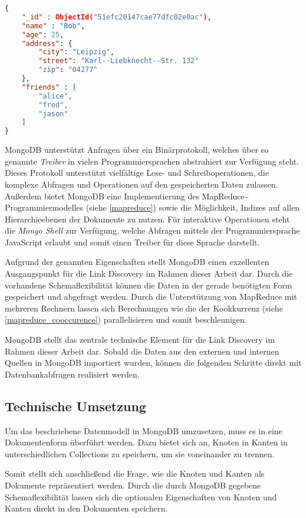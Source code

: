 \begin{lstlisting}[language=json, label={lst:json}, caption={Ein Beispiel für ein Dokument in MongoDB}]
{
    "_id" : ObjectId("51efc20147cae77dfc02e0ac"),
    "name" : "Bob",
    "age": 25,
    "address": {
        "city": "Leipzig",
        "street": "Karl--Liebknecht--Str. 132"
        "zip": "04277"
    },
    "friends" : [
        "alice",
        "fred",
        "jason"
    ]
}
\end{lstlisting}

MongoDB unterstützt Anfragen über ein Binärprotokoll, welches über so genannte \emph{Treiber} in vielen Programmiersprachen abstrahiert zur Verfügung steht. Dieses Protokoll unterstützt vielfältige Lese- und Schreiboperationen, die komplexe Abfragen und Operationen auf den gespeicherten Daten zulassen. Außerdem bietet MongoDB eine Implementierung des MapReduce--Programmiermodelles (siehe \cref{mapreduce}) sowie die Möglichkeit, Indizes auf allen Hierarchieebenen der Dokumente zu nutzen. Für interaktive Operationen steht die \emph{Mongo Shell} zur Verfügung, welche Abfragen mittels der Programmiersprache JavaScript erlaubt und somit einen Treiber für diese Sprache darstellt.

Aufgrund der genannten Eigenschaften stellt MongoDB einen exzellenten Ausgangspunkt für die Link Discovery im Rahmen dieser Arbeit dar. Durch die vorhandene Schemaflexibilität können die Daten in der gerade benötigten Form gespeichert und abgefragt werden. Durch die Unterstützung von MapReduce mit mehreren Rechnern lassen sich Berechnungen wie die der Kookkurrenz (siehe \cref{mapreduce_cooccurence}) parallelisieren und somit beschleunigen.

MongoDB stellt das zentrale technische Element für die Link Discovery im Rahmen dieser Arbeit dar. Sobald die Daten aus den externen und internen Quellen in MongoDB importiert wurden, können die folgenden Schritte direkt mit Datenbankabfragen realisiert werden.



\subsection{Technische Umsetzung}

Um das beschriebene Datenmodell in MongoDB umzusetzen, muss es in eine Dokumentenform überführt werden. Dazu bietet sich an, Knoten in Kanten in unterschiedlichen Collections zu speichern, um sie voneinander zu trennen.

Somit stellt sich anschließend die Frage, wie die Knoten und Kanten als Dokumente repräsentiert werden. Durch die durch MongoDB gegebene Schemaflexibilität lassen sich die optionalen Eigenschaften von Knoten und Kanten direkt in den Dokumenten speichern.

